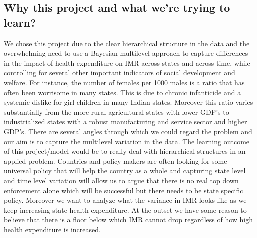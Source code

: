 \documentclass{article}
\begin{document}
\subsection{Why this project and what we're trying to learn?}
We chose this project due to the clear hierarchical structure in the data and the overwhelming need to use a Bayesian multilevel approach to capture differences in the impact of health expenditure on IMR across states and across time, while controlling for several other important indicators of social development and welfare. For instance, the number of females per 1000 males is a ratio that has often been worrisome in many states. This is due to chronic infanticide and a systemic dislike for girl children in many Indian states. Moreover this ratio varies substantially from the more rural agricultural states with lower GDP's to industrialized states with a robust manufacturing and service sector and higher GDP's. There are several angles through which we could regard the problem and our aim is to capture the multilevel variation in the data. The learning outcome of this project/model would be to really deal with hierarchical structures in an applied problem. Countries and policy makers are often looking for some universal policy that will help the country as a whole and capturing state level and time level variation will allow us to argue that there is no real top down enforcement alone which will be successful but there needs to be state specific policy. Moreover we want to analyze what the variance in IMR looks like as we keep increasing state health expenditure. At the outset we have some reason to believe that there is a floor below which IMR cannot drop regardless of how high health expenditure is increased.
\end{document}
